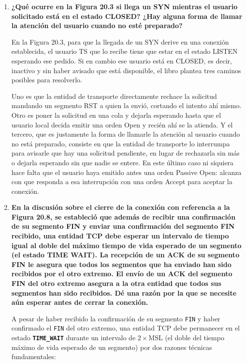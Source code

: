 \documentclass[11pt,a4paper]{article}
\begin{document}
\begin{enumerate}
    \item[\textbf{20.13}] \textbf{¿Qué ocurre en la Figura 20.3 si llega un SYN mientras el usuario solicitado está en el estado CLOSED? ¿Hay alguna forma de llamar la atención del usuario cuando no esté preparado?}

    En la Figura 20.3, para que la llegada de un SYN derive en una conexión establecida, el usuario TS que lo recibe tiene que estar en el estado LISTEN esperando ese pedido. Si en cambio ese usuario está en CLOSED, es decir, inactivo y sin haber avisado que está disponible, el libro plantea tres caminos posibles para resolverlo.

    Uno es que la entidad de transporte directamente rechace la solicitud mandando un segmento RST a quien la envió, cortando el intento ahí mismo. Otro es poner la solicitud en una cola y dejarla esperando hasta que el usuario local decida emitir una orden Open y recién ahí se la atienda. Y el tercero, que es justamente la forma de llamarle la atención al usuario cuando no está preparado, consiste en que la entidad de transporte lo interrumpa para avisarle que hay una solicitud pendiente, en lugar de rechazarla sin más o dejarla esperando sin que nadie se entere. En este último caso ni siquiera hace falta que el usuario haya emitido antes una orden Passive Open: alcanza con que responda a esa interrupción con una orden Accept para aceptar la conexión.

    \item[\textbf{20.14}] \textbf{En la discusión sobre el cierre de la conexión con referencia a la Figura 20.8, se estableció que además de recibir una confirmación de su segmento FIN y enviar una confirmación del segmento FIN recibido, una entidad TCP debe esperar un intervalo de tiempo igual al doble del máximo tiempo de vida esperado de un segmento (el estado TIME WAIT). La recepción de un ACK de su segmento FIN le asegura que todos los segmentos que ha enviado han sido recibidos por el otro extremo. El envío de un ACK del segmento FIN del otro extremo asegura a la otra entidad que todos sus segmentos han sido recibidos. Dé una razón por la que se necesite aún esperar antes de cerrar la conexión.}

    A pesar de haber recibido la confirmación de su segmento \texttt{FIN} y haber confirmado el \texttt{FIN} del otro extremo, una entidad TCP debe permanecer en el estado \textbf{\texttt{TIME\_WAIT}} durante un intervalo de $2 \times \text{MSL}$ (el doble del tiempo máximo de vida esperado de un segmento) por dos razones técnicas fundamentales:


\end{enumerate}
\end{document}
